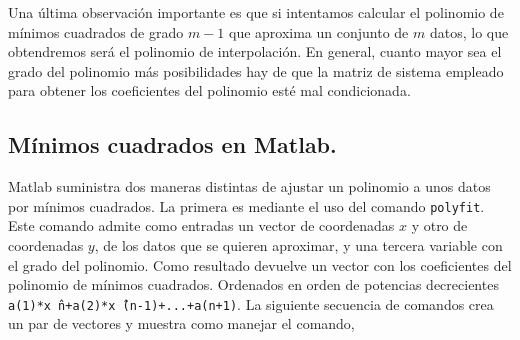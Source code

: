 %
%
%
%
%
%
%
\begin{paracol}{2}
Una última observación importante es que si intentamos calcular el polinomio de mínimos cuadrados de grado $m-1$ que aproxima un conjunto de $m$ datos, lo que obtendremos será el polinomio de interpolación. En general, cuanto mayor sea el grado del polinomio más posibilidades hay de que la matriz de sistema empleado para obtener los coeficientes del polinomio esté mal condicionada.

\subsection{Mínimos cuadrados en Matlab.}

Matlab suministra dos maneras distintas de ajustar un polinomio a unos datos por mínimos cuadrados. La primera es mediante el uso del comando \texttt{polyfit}. Este comando admite como entradas un vector de coordenadas $x$ y otro de coordenadas $y$, de los datos que se quieren aproximar, y una tercera variable con el grado del polinomio. Como resultado devuelve un vector con los coeficientes del polinomio de mínimos cuadrados. Ordenados en orden de potencias decrecientes \texttt{a(1)*x\^\  n+a(2)*x\^\  (n-1)+...+a(n+1)}. La siguiente secuencia de comandos crea un par de vectores y muestra como manejar el comando,
\end{paracol}


